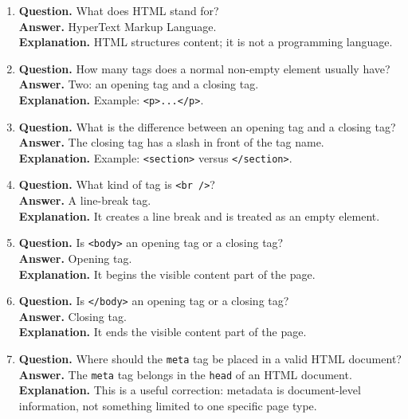 \documentclass[11pt,a4paper]{article}
\begin{document}
\begin{enumerate}
  \item \textbf{Question.} What does HTML stand for?\\
  \textbf{Answer.} HyperText Markup Language.\\
  \textbf{Explanation.} HTML structures content; it is not a programming language.

  \item \textbf{Question.} How many tags does a normal non-empty element usually have?\\
  \textbf{Answer.} Two: an opening tag and a closing tag.\\
  \textbf{Explanation.} Example: \texttt{<p>...</p>}.

  \item \textbf{Question.} What is the difference between an opening tag and a closing tag?\\
  \textbf{Answer.} The closing tag has a slash in front of the tag name.\\
  \textbf{Explanation.} Example: \texttt{<section>} versus \texttt{</section>}.

  \item \textbf{Question.} What kind of tag is \texttt{<br />}?\\
  \textbf{Answer.} A line-break tag.\\
  \textbf{Explanation.} It creates a line break and is treated as an empty element.

  \item \textbf{Question.} Is \texttt{<body>} an opening tag or a closing tag?\\
  \textbf{Answer.} Opening tag.\\
  \textbf{Explanation.} It begins the visible content part of the page.

  \item \textbf{Question.} Is \texttt{</body>} an opening tag or a closing tag?\\
  \textbf{Answer.} Closing tag.\\
  \textbf{Explanation.} It ends the visible content part of the page.

  \item \textbf{Question.} Where should the \texttt{meta} tag be placed in a valid HTML document?\\
  \textbf{Answer.} The \texttt{meta} tag belongs in the \texttt{head} of an HTML document.\\
  \textbf{Explanation.} This is a useful correction: metadata is document-level information, not something limited to one specific page type.


\end{enumerate}
\end{document}
